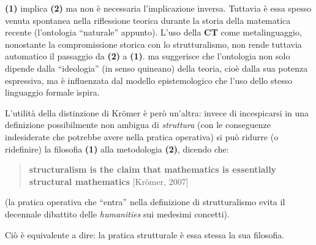 \textbf{(1)} implica \textbf{(2)} ma non è necessaria l'implicazione inversa. \endfo Tuttavia è essa spesso venuta spontanea nella riflessione teorica durante la storia della matematica recente (l'ontologia ``naturale'' appunto). L'uso della \textbf{CT} come metalinguaggio, nonostante la compromissione storica con lo strutturalismo, non rende tuttavia automatico il passaggio da \textbf{(2)} a \textbf{(1)}. ma suggerisce che l'ontologia non solo dipende dalla ``ideologia'' (in senso quineano) della teoria, cioè dalla sua potenza espressiva, ma è influenzata dal modello epistemologico che l'uso dello stesso linguaggio formale ispira.

L'utilità della distinzione di Kr\"omer è però un'altra: invece di incespicarsi in una definizione possibilmente non ambigua di \textit{struttura} (con le conseguenze indesiderate che potrebbe avere nella pratica operativa) si può ridurre (o ridefinire) la filosofia \textbf{(1)} alla metodologia \textbf{(2)}, dicendo che:
\begin{quotation}
	\textbf{structuralism is the claim that mathematics
		is essentially structural mathematics} [Kr\"omer, 2007]
\end{quotation}
(la pratica operativa che ``entra'' nella definizione di strutturalismo evita il decennale dibattito delle \textit{humanities} sui medesimi concetti).

Ciò è equivalente a dire: la pratica strutturale è essa stessa la sua filosofia.

